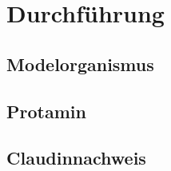 \section{Durchführung}

\subsection{Modelorganismus}

\subsection{Protamin}

\subsection{Claudinnachweis}